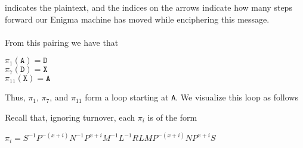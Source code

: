 indicates the plaintext,
and the indices on the arrows indicate how many steps forward our
Enigma machine has moved while enciphering this message.
\\\\From this pairing we have that
\begin{center}
  $\pi_1(\texttt{A}) = {\texttt{D}}$\\
  $\pi_7(\texttt{D}) = {\texttt{X}}$\\
  $\pi_{11}(\texttt{X}) = {\texttt{A}}$\\
\end{center}
Thus, $\pi_1$, $\pi_7$, and $\pi_{11}$ form a loop starting
at \texttt{A}. We visualize this loop as follows
\begin{center}
\end{center}
Recall that, ignoring turnover, each $\pi_i$ is of the form
\begin{center}
  $\pi_i = S^{-1}P^{-(x+i)}N^{-1}P^{x+i}M^{-1}L^{-1}RLMP^{-(x+i)}NP^{x+i}S$
\end{center}

